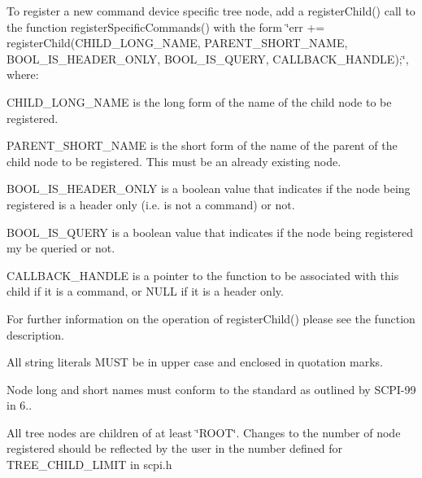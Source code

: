 To register a new command device specific tree node, add a register\-Child() call to the function register\-Specific\-Commands() with the form \char`\"{}err += register\-Child(\-C\-H\-I\-L\-D\-\_\-\-L\-O\-N\-G\-\_\-\-N\-A\-M\-E, P\-A\-R\-E\-N\-T\-\_\-\-S\-H\-O\-R\-T\-\_\-\-N\-A\-M\-E,
\-B\-O\-O\-L\-\_\-\-I\-S\-\_\-\-H\-E\-A\-D\-E\-R\-\_\-\-O\-N\-L\-Y, B\-O\-O\-L\-\_\-\-I\-S\-\_\-\-Q\-U\-E\-R\-Y, C\-A\-L\-L\-B\-A\-C\-K\-\_\-\-H\-A\-N\-D\-L\-E);\char`\"{}, where\-:
\begin{DoxyItemize}
\item C\-H\-I\-L\-D\-\_\-\-L\-O\-N\-G\-\_\-\-N\-A\-M\-E is the long form of the name of the child node to be registered.
\item P\-A\-R\-E\-N\-T\-\_\-\-S\-H\-O\-R\-T\-\_\-\-N\-A\-M\-E is the short form of the name of the parent of the child node to be registered. This must be an already existing node.
\item B\-O\-O\-L\-\_\-\-I\-S\-\_\-\-H\-E\-A\-D\-E\-R\-\_\-\-O\-N\-L\-Y is a boolean value that indicates if the node being registered is a header only (i.\-e. is not a command) or not.
\item B\-O\-O\-L\-\_\-\-I\-S\-\_\-\-Q\-U\-E\-R\-Y is a boolean value that indicates if the node being registered my be queried or not.
\item C\-A\-L\-L\-B\-A\-C\-K\-\_\-\-H\-A\-N\-D\-L\-E is a pointer to the function to be associated with this child if it is a command, or N\-U\-L\-L if it is a header only.
\end{DoxyItemize}

For further information on the operation of register\-Child() please see the function description.

All string literals M\-U\-S\-T be in upper case and enclosed in quotation marks.

Node long and short names must conform to the standard as outlined by S\-C\-P\-I-\/99 in 6..

All tree nodes are children of at least \char`\"{}\-R\-O\-O\-T\char`\"{}. Changes to the number of node registered should be reflected by the user in the number defined for T\-R\-E\-E\-\_\-\-C\-H\-I\-L\-D\-\_\-\-L\-I\-M\-I\-T in scpi.\-h 